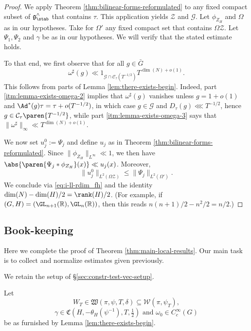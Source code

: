 \begin{proof}
  We apply Theorem \ref{thm:bilinear-forms-reformulated} to any fixed compact subset of $\mathfrak{g}^\wedge_{\stab}$ that contains $\tau$.  This application yields $\mathcal{Z}$ and $\mathcal{G}$.  Let $\phi_{Z_H}$ and $\Omega$ as in our hypotheses.  Take for $\Omega '$ any fixed compact set that contains $\Omega \mathcal{Z}$.  Let $\Psi_1, \Psi_2$ and $\gamma$ be as in our hypotheses.  We will verify that the stated estimate holds.

  To that end, we first observe that for all $g \in \bar{G}$
  \begin{equation*}
    \omega^\sharp(g) \ll
    1_{\mathcal{G} \cap \mathcal{C}_\tau(T^{-1/2})}     T^{\dim(N) + o(1)}.
  \end{equation*}
  This follows from parts of Lemma \ref{lem:there-exists-begin}.  Indeed, part \eqref{itm:lemma-exists-omega-2} implies that $\omega^\sharp(g)$ vanishes unless $g = 1 + o(1)$ and $\Ad^*(g) \tau = \tau + o(T^{-1/2})$, in which case $g \in \mathcal{G}$ and $D_\tau(g) \lll T^{-1/2}$, hence $g \in \mathcal{C}_\tau\paren{T^{-1/2}}$, while part \eqref{itm:lemma-exists-omega-3} says that $\|\omega^\sharp\|_{\infty} \ll T^{\dim(N)+o(1)}$.

  We now set $u_j^0 := \Psi_j$ and define $u_j$ as in Theorem \ref{thm:bilinear-forms-reformulated}.  Since $\lVert \phi_{Z_H} \rVert_{L^\infty} \ll 1$, we then have $\abs{ \paren{\Psi_j \ast \phi_{Z_H}}(x) } \ll u_j(x)$.  Moreover,
  \begin{equation*}
    \lVert u_j^0 \rVert_{L^2(\Omega \mathcal{Z})} \leq \lVert \Psi_j \rVert_{L^2(\Omega ')}.
  \end{equation*}
  We conclude via \eqref{eq:i-ll-rdim_fh} and the identity $\dim(N) - \dim(H)/2 = \rank(H)/2$.  (For example, if $(G,H) = (\GL_{n+1}(\mathbb{R}), \GL_n(\mathbb{R}))$, then this reads $n(n+1)/2 - n^2/2 = n/2$.)
\end{proof}




\subsection{Book-keeping}\label{sec:book-keeping}
Here we complete the proof of Theorem \ref{thm:main-local-results}.  Our main task is to collect and normalize estimates given previously.

We retain the setup of \S\ref{sec:constr-test-vec-setup}.

Let
\begin{equation*}
  W_T \in \mathfrak{W}(\pi,\psi,T,\delta) \subseteq \mathcal{W}(\pi,\psi_T),
\end{equation*}
\begin{equation*}
  \gamma \in \mathfrak{C}(H,-\theta_H(\psi^{-1}),T,\tfrac{1}{2})  \text{ and }  \omega_0 \in C_c^\infty(G)
\end{equation*}
be as furnished by Lemma \ref{lem:there-exists-begin}.

